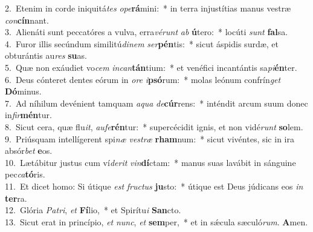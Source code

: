 {2.~}Etenim in corde iniquitá\textit{tes} \textit{o}\textit{pe}\textbf{rá}mini:~* in terra injustítias manus vestræ \textit{con}\textbf{cín}nant.\\
{3.~}Alienáti sunt peccatóres a vulva, erra\textit{vé}\textit{runt} \textit{ab} \textbf{ú}tero:~* locúti \textit{sunt} \textbf{fal}sa.\\
{4.~}Furor illis secúndum similitú\textit{di}\textit{nem} \textit{ser}\textbf{pén}tis:~* sicut áspidis surdæ, et obturántis au\textit{res} \textbf{su}as.\\
{5.~}Quæ non exáudiet vo\textit{cem} \textit{in}\textit{can}\textbf{tán}tium:~* et venéfici incantántis sa\textit{pi}\textbf{én}ter.\\
{6.~}Deus cónteret dentes eórum in \textit{o}\textit{re} \textit{i}\textbf{psó}rum:~* molas leónum confrín\textit{get} \textbf{Dó}minus.\\
{7.~}Ad níhilum devénient tamquam \textit{a}\textit{qua} \textit{de}\textbf{cúr}rens:~* inténdit arcum suum donec in\textit{fir}\textbf{mén}tur.\\
{8.~}Sicut cera, quæ flu\textit{it}, \textit{au}\textit{fe}\textbf{rén}tur:~* supercécidit ignis, et non vidé\textit{runt} \textbf{so}lem.\\
{9.~}Priúsquam intellígerent spi\textit{næ} \textit{ve}\textit{stræ} \textbf{rham}num:~* sicut vivéntes, sic in ira absór\textit{bet} \textbf{e}os.\\
{10.~}Lætábitur justus cum ví\textit{de}\textit{rit} \textit{vin}\textbf{dí}ctam:~* manus suas lavábit in sánguine pec\textit{ca}\textbf{tó}ris.\\
{11.~}Et dicet homo: Si útique \textit{est} \textit{fru}\textit{ctus} \textbf{ju}sto:~* útique est Deus júdicans eos \textit{in} \textbf{ter}ra.\\
{12.~}Glória \textit{Pa}\textit{tri}, \textit{et} \textbf{Fí}lio,~* et Spirítu\textit{i} \textbf{San}cto.\\
{13.~}Sicut erat in princípio, \textit{et} \textit{nunc}, \textit{et} \textbf{sem}per,~* et in sǽcula sæculó\textit{rum}. \textbf{A}men.\\

